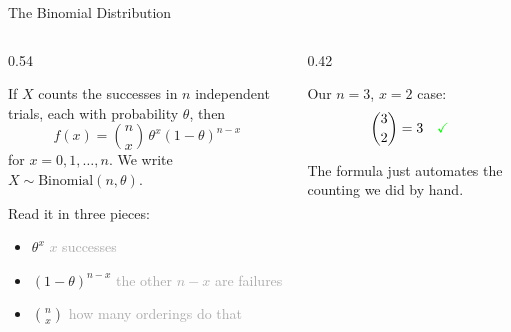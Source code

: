 \documentclass[9pt,english,aspectratio=169]{beamer}
\begin{document}
\begin{frame}{The Binomial Distribution}

  \begin{columns}[T]
    \begin{column}{0.54\textwidth}
      \begin{definitionbox}
        If $X$ counts the successes in $n$ independent trials, each with
        probability $\theta$, then
        \[
          f(x) = \binom{n}{x}\, \theta^{x} (1-\theta)^{n-x}
        \]
        for $x = 0, 1, \ldots, n$. We write $X \sim \text{Binomial}(n, \theta)$.
      \end{definitionbox}

      \vspace{0.8em}
      Read it in three pieces:
      \begin{itemize}
        \item $\theta^{x}$ \hfill {\small\textcolor{DarkGray}{$x$ successes}}
              \vspace{0.2em}
        \item $(1-\theta)^{n-x}$ \hfill {\small\textcolor{DarkGray}{the other $n-x$ are failures}}
              \vspace{0.2em}
        \item $\binom{n}{x}$ \hfill {\small\textcolor{DarkGray}{how many orderings do that}}
      \end{itemize}
    \end{column}
    \begin{column}{0.42\textwidth}
      \vspace{1.5em}
      \begin{methodbox}
        Our $n = 3$, $x = 2$ case:
        \[
          \binom{3}{2} = 3 \quad \textcolor{green}{\checkmark}
        \]
        \vspace{-0.5em}

        The formula just automates the counting we did by hand.
      \end{methodbox}
    \end{column}
  \end{columns}

  \vspace{0.3em}

\end{frame}
\end{document}
